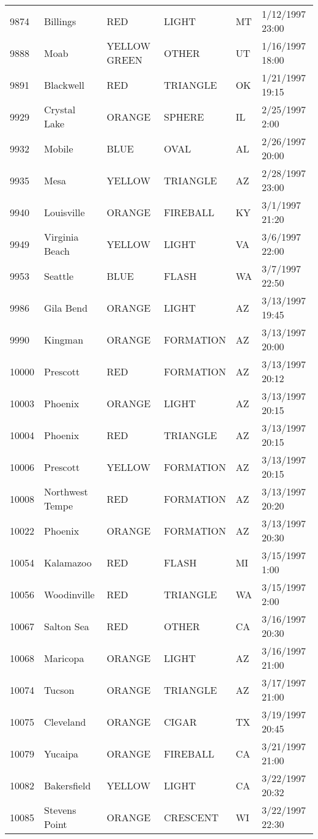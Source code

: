 \begin{tabular}{llllll}
9874 & Billings & RED & LIGHT & MT & 1/12/1997 23:00 \\
9888 & Moab & YELLOW GREEN & OTHER & UT & 1/16/1997 18:00 \\
9891 & Blackwell & RED & TRIANGLE & OK & 1/21/1997 19:15 \\
9929 & Crystal Lake & ORANGE & SPHERE & IL & 2/25/1997 2:00 \\
9932 & Mobile & BLUE & OVAL & AL & 2/26/1997 20:00 \\
9935 & Mesa & YELLOW & TRIANGLE & AZ & 2/28/1997 23:00 \\
9940 & Louisville & ORANGE & FIREBALL & KY & 3/1/1997 21:20 \\
9949 & Virginia Beach & YELLOW & LIGHT & VA & 3/6/1997 22:00 \\
9953 & Seattle & BLUE & FLASH & WA & 3/7/1997 22:50 \\
9986 & Gila Bend & ORANGE & LIGHT & AZ & 3/13/1997 19:45 \\
9990 & Kingman & ORANGE & FORMATION & AZ & 3/13/1997 20:00 \\
10000 & Prescott & RED & FORMATION & AZ & 3/13/1997 20:12 \\
10003 & Phoenix & ORANGE & LIGHT & AZ & 3/13/1997 20:15 \\
10004 & Phoenix & RED & TRIANGLE & AZ & 3/13/1997 20:15 \\
10006 & Prescott & YELLOW & FORMATION & AZ & 3/13/1997 20:15 \\
10008 & Northwest Tempe & RED & FORMATION & AZ & 3/13/1997 20:20 \\
10022 & Phoenix & ORANGE & FORMATION & AZ & 3/13/1997 20:30 \\
10054 & Kalamazoo & RED & FLASH & MI & 3/15/1997 1:00 \\
10056 & Woodinville & RED & TRIANGLE & WA & 3/15/1997 2:00 \\
10067 & Salton Sea & RED & OTHER & CA & 3/16/1997 20:30 \\
10068 & Maricopa & ORANGE & LIGHT & AZ & 3/16/1997 21:00 \\
10074 & Tucson & ORANGE & TRIANGLE & AZ & 3/17/1997 21:00 \\
10075 & Cleveland & ORANGE & CIGAR & TX & 3/19/1997 20:45 \\
10079 & Yucaipa & ORANGE & FIREBALL & CA & 3/21/1997 21:00 \\
10082 & Bakersfield & YELLOW & LIGHT & CA & 3/22/1997 20:32 \\
10085 & Stevens Point & ORANGE & CRESCENT & WI & 3/22/1997 22:30 \\

\end{tabular}
